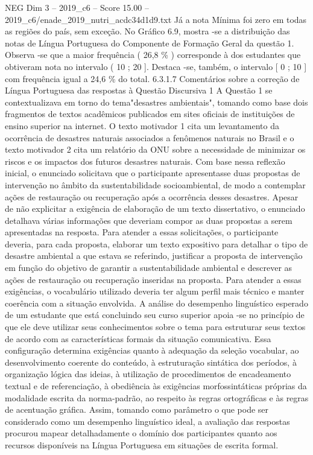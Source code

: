 \begin{textsample}{NEG Dim 3 – 2019\_c6 – Score 15.00 – 2019\_c6/enade\_2019\_nutri\_acdc34d1d9.txt}
Já a nota Mínima foi zero em todas as regiões do país, sem exceção.
No Gráfico 6.9, mostra -se a distribuição das notas de Língua Portuguesa do Componente de Formação Geral da questão 1.
Observa -se que a maior frequência ( 26,8 \% ) corresponde à dos estudantes que obtiveram nota no intervalo ( 10 ; 20 ].
Destaca -se, também, o intervalo [ 0 ; 10 ] com frequência igual a 24,6 \% do total. 6.3.1.7 Comentários sobre a correção de Língua Portuguesa das respostas à Questão Discursiva 1 A Questão 1 se contextualizava em torno do tema"desastres ambientais", tomando como base dois fragmentos de textos acadêmicos publicados em sites oficiais de instituições de ensino superior na internet.
O texto motivador 1 cita um levantamento da ocorrência de desastres naturais associados a fenômenos naturais no Brasil e o texto motivador 2 cita um relatório da ONU sobre a necessidade de minimizar os riscos e os impactos dos futuros desastres naturais.
Com base nessa reflexão inicial, o enunciado solicitava que o participante apresentasse duas propostas de intervenção no âmbito da sustentabilidade socioambiental, de modo a contemplar ações de restauração ou recuperação após a ocorrência desses desastres.
Apesar de não explicitar a exigência de elaboração de um texto dissertativo, o enunciado detalhava várias informações que deveriam compor as duas propostas a serem apresentadas na resposta.
Para atender a essas solicitações, o participante deveria, para cada proposta, elaborar um texto expositivo para detalhar o tipo de desastre ambiental a que estava se referindo, justificar a proposta de intervenção em função do objetivo de garantir a sustentabilidade ambiental e descrever as ações de restauração ou recuperação inseridas na proposta.
Para atender a essas exigências, o vocabulário utilizado deveria ter algum perfil mais técnico e manter coerência com a situação envolvida.
A análise do desempenho linguístico esperado de um estudante que está concluindo seu curso superior apoia -se no princípio de que ele deve utilizar seus conhecimentos sobre o tema para estruturar seus textos de acordo com as características formais da situação comunicativa.
Essa configuração determina exigências quanto à adequação da seleção vocabular, ao desenvolvimento coerente do conteúdo, à estruturação sintática dos períodos, à organização lógica das ideias, à utilização de procedimentos de encadeamento textual e de referenciação, à obediência às exigências morfossintáticas próprias da modalidade escrita da norma-padrão, ao respeito às regras ortográficas e às regras de acentuação gráfica.
Assim, tomando como parâmetro o que pode ser considerado como um desempenho linguístico ideal, a avaliação das respostas procurou mapear detalhadamente o domínio dos participantes quanto aos recursos disponíveis na Língua Portuguesa em situações de escrita formal.

\end{textsample}
